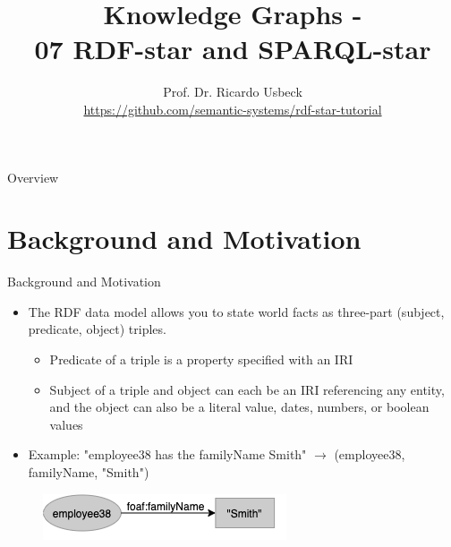 \documentclass[aspectratio=169]{beamer}
\title[Ontologies]{Knowledge Graphs - \\07 RDF-star and SPARQL-star}
\author[Prof. Dr. R. Usbeck]{Prof. Dr. Ricardo Usbeck\\
\url{https://github.com/semantic-systems/rdf-star-tutorial}}
\date{}
\begin{document}
\begin{frame}
\titlepage
\end{frame}

\begin{frame}{Overview}{\quad}
\tableofcontents
\end{frame}

\section{Background and Motivation}
\begin{frame}{Background and Motivation}
    \begin{itemize}
        \item The RDF data model allows you to state world facts as three-part (subject, predicate, object) triples.
        \begin{itemize}
            \item Predicate of a triple is a property specified with an IRI
            \item Subject of a triple and object can each be an IRI referencing any entity, and the object can also be a literal value, dates, numbers, or boolean values
        \end{itemize}
        \item Example: "employee38 has the familyName Smith" $\rightarrow$ (employee38, familyName, "Smith")
    \end{itemize}
    \begin{figure}
        \centering
        \includegraphics[scale=0.5]{lecture/images/Example-1.png}
    \end{figure}
\end{frame}
\end{document}
